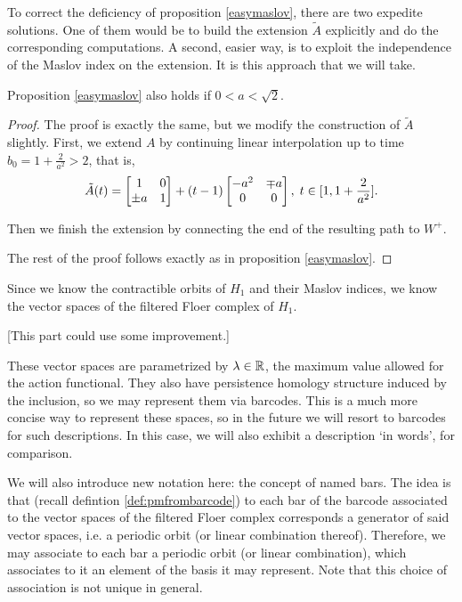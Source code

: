 To correct the deficiency of proposition \ref{easymaslov}, there are two expedite solutions. One of them would be to build the extension $\tilde A$ explicitly and do the corresponding computations. A second, easier way, is to exploit the independence of the Maslov index on the extension. It is this approach that we will take.

\begin{prop}
Proposition \ref{easymaslov} also holds if $0 < a < \sqrt2$.
\end{prop}

\begin{proof}
The proof is exactly the same, but we modify the construction of $\tilde A$ slightly. First, we extend $A$ by continuing linear interpolation up to time $b_0 = 1 + \frac2{a^2} > 2$, that is,
\begin{equation}
\tilde A(t) = \begin{bmatrix}
1 & 0\\
\pm a & 1
\end{bmatrix}
+
(t-1)
\begin{bmatrix}
- a^2 &  \mp a\\
0 & 0
\end{bmatrix}, \; t \in \interval1{1+\frac2{a^2}}.
\end{equation}

Then we finish the extension by connecting the end of the resulting path to $W^+$.

The rest of the proof follows exactly as in proposition \ref{easymaslov}.
\end{proof}

Since we know the contractible orbits of $H_1$ and their Maslov indices, we know the vector spaces of the filtered Floer complex of $H_1$.

[This part could use some improvement.]

These vector spaces are parametrized by $\lambda \in \mathbb{R}$, the maximum value allowed for the action functional. They also have persistence homology structure induced by the inclusion, so we may represent them via barcodes. This is a much more concise way to represent these spaces, so in the future we will resort to barcodes for such descriptions. In this case, we will also exhibit a description `in words', for comparison.

We will also introduce new notation here: the concept of named bars. The idea is that (recall defintion \ref{def:pmfrombarcode}) to each bar of the barcode associated to the vector spaces of the filtered Floer complex corresponds a generator of said vector spaces, i.e. a periodic orbit (or linear combination thereof). Therefore, we may associate to each bar a periodic orbit (or linear combination), which associates to it an element of the basis it may represent. Note that this choice of association is not unique in general.

